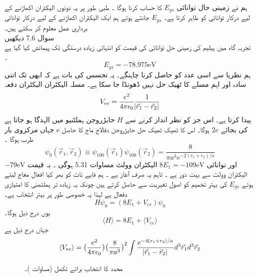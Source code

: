 ہم نے زمینی حال توانائی 
 \(E_{gs}\)
  کا حساب کرنا ہوگا ۔ طبی طور پر یہ دونوں الیکٹران اکھاڑنے کے لیے درکار توانائی کو ظاہر کرتا ہے۔ 
 \(E_{gs}\)
   جانتے ہوئے ہم ایک الیکٹران اکھاڑنے کے لیے درکار توانائی برداری عمل معلوم کر سکتے ہیں۔\\
سوال 7.6 دیکھیں\\  
تجربہ گاہ میں ہیلیم کی زمینی حل توانائی کی قیمت کو انتہائی زیادہ درستگی تک پیمائش کیا گیا ہے ۔
\[E_{gs}=-78.975 \text{eV}\]
ہم نظریا سے اسی عدد کو حاصل کرنا چاہنگے۔ یہ تجسس کی بات ہے کہ ابھی تک اتنی سادہ اور اہم مسلے کا ٹھیک حل نہیں ڈھونڈا جا سکا ہے۔
مسلہ الیکٹران الیکٹران دفعہ 
\[V_{ee}=\frac{e^{2}}{4\pi\epsilon_{0}}\frac{1}{\abs{\vec{r}_{1}-\vec{r}_{2}}}\]
پیدا کرتا ہے۔ اس جز کو نظر انداز کرنے سے
 \(H \)
حایڑروجن ہملٹنیو میں الہدگا ہو جاتا ہے جہاں مرکزوی بار e کی بجائے
 \(2e\)
 ہوگا۔ اس کا ٹھیک ٹھیک حل حایڑروجن دفالاج ماج کا حاصل ظرب ہوگا ۔
\[\psi_{0}(\vec{r}_{1},\vec{r}_{2})\equiv \psi_{100}(\vec{r}_{1})\psi_{100}(\vec{r}_{2})=\frac{8}{\pi a^{3}e^{-2(r_{1}+r_{2})/a}}\]
اور توانائی
 \(8E_{1}=-109\text{eV}\)
 الیکٹران وولٹ  
مساوات 5.31 ہوگی ۔ یہ قیمت
 \(-79\text{eV}\) 
 الیکٹران وولٹ سے بہت دور ہے ۔ تاہم یہ صرف آغاز ہے ۔ ہم فایے ناٹ کو بھر کیا افعال معاج لیتے ہوئے  
 \(E_{gs}\)
  کی بہتر تخمیم کو اصول تغیریت سے حاصل کرتے ہیں چونکہ یہ زیادہ تر ہملٹھنی کا امتیازی  دفعال ہے لہذا یہ خصوصی طور پر بہتر انتخاب ہے۔
\[H\psi_{0}=(8E_{1}+V_{ee})\psi_{0}\]
یوں درج ذیل ہوگا۔ 
\[\langle H \rangle=8E_{1}+\langle V_{ee}\rangle\]
جہاں درج ذیل ہے 
\[\langle V_{ee}\rangle=\big(\frac{e^{2}}{4\pi\epsilon_{0}}\big )\big (\frac{8}{\pi a^{3}}\big )^{2}\int \frac{e^{-4(r_{1}+r_{2})/a}}{\abs{\vec{r}_{1}-\vec{r}_{2}}}d^{3}\vec{r}_{1}d^{3}\vec{r}_{2}\]

\begin{figure}
\centering
{}
\caption{محدد کا انتخاب برائے  تکمل (مساوات )۔}
\label{شکل_تغیریت_محدد_انتخاب_رداس_دوم_تکمل}
\end{figure}


